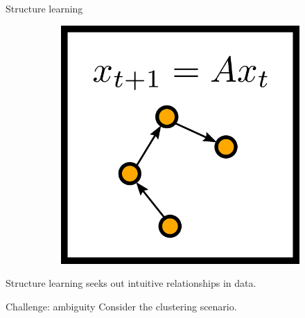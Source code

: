 \documentclass[10pt, compress]{beamer}
\begin{document}
\begin{frame}{Structure learning}
\begin{figure}
\begin{subfigure}[t]{0.27\textwidth}
    \end{subfigure}
    \pause
    \hfill
    \begin{subfigure}[t]{0.27\textwidth}
        \centering
        \includegraphics[width=\textwidth]{img/lds}
    \end{subfigure}
  \end{figure}
  \pause
  Structure learning seeks out intuitive relationships in data.

\end{frame}

\begin{frame}{Challenge: ambiguity}
  \centering
  Consider the clustering scenario.



\end{frame}
\end{document}
